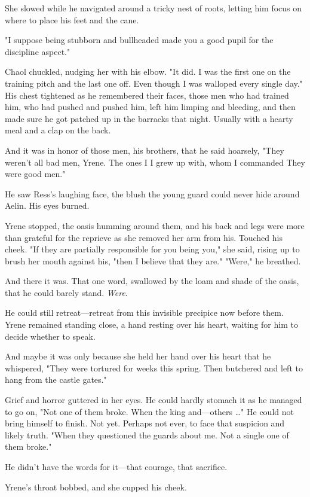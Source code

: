 She slowed while he navigated around a tricky nest of roots, letting him focus on where to place his feet and the cane.

"I suppose being stubborn and bullheaded made you a good pupil for the discipline aspect."

Chaol chuckled, nudging her with his elbow. "It did. I was the first one on the training pitch and the last one off. Even though I was walloped every single day." His chest tightened as he remembered their faces, those men who had trained him, who had pushed and pushed him, left him limping and bleeding, and then made sure he got patched up in the barracks that night. Usually with a hearty meal and a clap on the back.

And it was in honor of those men, his brothers, that he said hoarsely, "They weren't all bad men, Yrene. The ones I  I grew up with, whom I commanded  They were good men."

He saw Ress's laughing face, the blush the young guard could never hide around Aelin. His eyes burned.

Yrene stopped, the oasis humming around them, and his back and legs were more than grateful for the reprieve as she removed her arm from his. Touched his cheek. "If they are partially responsible for you being
 you," she said, rising up to brush her mouth against his, "then I believe that they are." "Were," he breathed.

And there it was. That one word, swallowed by the loam and shade of the oasis, that he could barely stand. \emph{Were}.

He could still retreat---retreat from this invisible precipice now before them. Yrene remained standing close, a hand resting over his heart, waiting for him to decide whether to speak.

And maybe it was only because she held her hand over his heart that he whispered, "They were tortured for weeks this spring. Then butchered and left to hang from the castle gates."

Grief and horror guttered in her eyes. He could hardly stomach it as he managed to go on, "Not one of them broke. When the king and---others
\ldots" He could not bring himself to finish. Not yet. Perhaps not ever, to face that suspicion and likely truth. "When they questioned the guards about me. Not a single one of them broke."

He didn't have the words for it---that courage, that sacrifice.

Yrene's throat bobbed, and she cupped his cheek.

